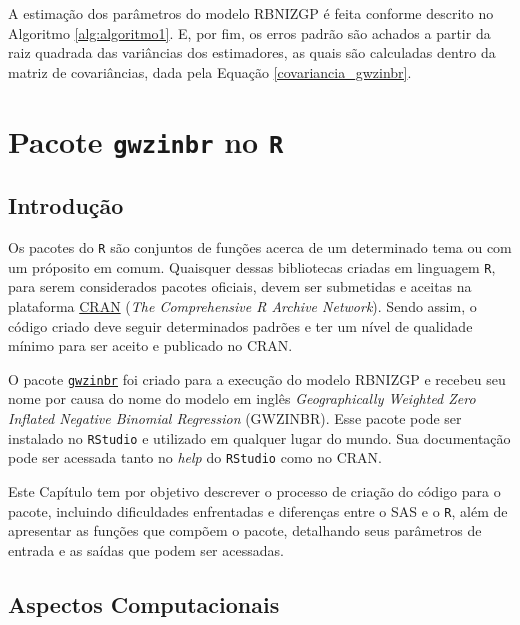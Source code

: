 \documentclass[12pt, a4paper, twoside]{report}
\numberwithin{equation}{section} %
\begin{document}
A estimação dos parâmetros do modelo RBNIZGP é feita conforme descrito no Algoritmo \ref{alg:algoritmo1}. E, por fim, os erros padrão são achados a partir da raiz quadrada das variâncias dos estimadores, as quais são calculadas dentro da matriz de covariâncias, dada pela Equação \eqref{covariancia_gwzinbr}.

\chapter{Pacote \texttt{gwzinbr} no \texttt{R}}

\section{Introdução}

Os pacotes do \texttt{R} são conjuntos de funções acerca de um determinado tema ou com um próposito em comum. Quaisquer dessas bibliotecas criadas em linguagem \texttt{R}, para serem considerados pacotes oficiais, devem ser submetidas e aceitas na plataforma \href{https://cran.r-project.org/}{CRAN} (\textit{The Comprehensive R Archive Network}). Sendo assim, o código criado deve seguir determinados padrões e ter um nível de qualidade mínimo para ser aceito e publicado no CRAN.

O pacote \href{https://cran.r-project.org/web/packages/gwzinbr/index.html}{\texttt{gwzinbr}} foi criado para a execução do modelo RBNIZGP e recebeu seu nome por causa do nome do modelo em inglês \textit{Geographically Weighted Zero Inflated Negative Binomial Regression} (GWZINBR). Esse pacote pode ser instalado no \texttt{RStudio} e utilizado em qualquer lugar do mundo. Sua documentação pode ser acessada tanto no \textit{help} do \texttt{RStudio} como no CRAN.

Este Capítulo tem por objetivo descrever o processo de criação do código para o pacote, incluindo dificuldades enfrentadas e diferenças entre o SAS e o \texttt{R}, além de apresentar as funções que compõem o pacote, detalhando seus parâmetros de entrada e as saídas que podem ser acessadas.


\section{Aspectos Computacionais}\label{secao_5_2}
\end{document}
